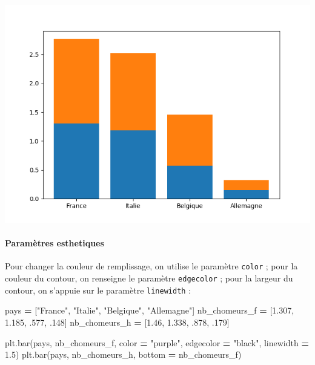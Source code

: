\documentclass[12pt,]{book}
\newenvironment{Shaded}{\begin{snugshade}}{\end{snugshade}}
\newcommand{\DecValTok}[1]{\textcolor[rgb]{0.00,0.00,0.81}{#1}}
\newcommand{\FloatTok}[1]{\textcolor[rgb]{0.00,0.00,0.81}{#1}}
\newcommand{\StringTok}[1]{\textcolor[rgb]{0.31,0.60,0.02}{#1}}
\newcommand{\OperatorTok}[1]{\textcolor[rgb]{0.81,0.36,0.00}{\textbf{#1}}}
\newcommand{\NormalTok}[1]{#1}
\let\oldparagraph\paragraph
\renewcommand{\paragraph}[1]{\oldparagraph{#1}\mbox{}}
\numberwithin{equation}{section}
\numberwithin{countremarque}{section}
\begin{document}
\begin{center}\includegraphics[width=9.03in]{figs/pyplot/barplot_stack} \end{center}

\paragraph{Paramètres esthetiques}\label{parametres-esthetiques}

Pour changer la couleur de remplissage, on utilise le paramètre
\texttt{color} ; pour la couleur du contour, on renseigne le paramètre
\texttt{edgecolor} ; pour la largeur du contour, on s'appuie sur le
paramètre \texttt{linewidth} :

\begin{Shaded}
\begin{Highlighting}[]
\NormalTok{pays }\OperatorTok{=}\NormalTok{ [}\StringTok{"France"}\NormalTok{, }\StringTok{"Italie"}\NormalTok{, }\StringTok{"Belgique"}\NormalTok{, }\StringTok{"Allemagne"}\NormalTok{]}
\NormalTok{nb_chomeurs_f }\OperatorTok{=}\NormalTok{ [}\FloatTok{1.307}\NormalTok{, }\FloatTok{1.185}\NormalTok{, .}\DecValTok{577}\NormalTok{, .}\DecValTok{148}\NormalTok{]}
\NormalTok{nb_chomeurs_h }\OperatorTok{=}\NormalTok{ [}\FloatTok{1.46}\NormalTok{, }\FloatTok{1.338}\NormalTok{, .}\DecValTok{878}\NormalTok{, .}\DecValTok{179}\NormalTok{]}

\NormalTok{plt.bar(pays, nb_chomeurs_f, color }\OperatorTok{=} \StringTok{"purple"}\NormalTok{,}
\NormalTok{        edgecolor }\OperatorTok{=} \StringTok{"black"}\NormalTok{, linewidth }\OperatorTok{=} \FloatTok{1.5}\NormalTok{)}
\NormalTok{plt.bar(pays, nb_chomeurs_h, bottom }\OperatorTok{=}\NormalTok{ nb_chomeurs_f)}
\end{Highlighting}
\end{Shaded}
\end{document}
